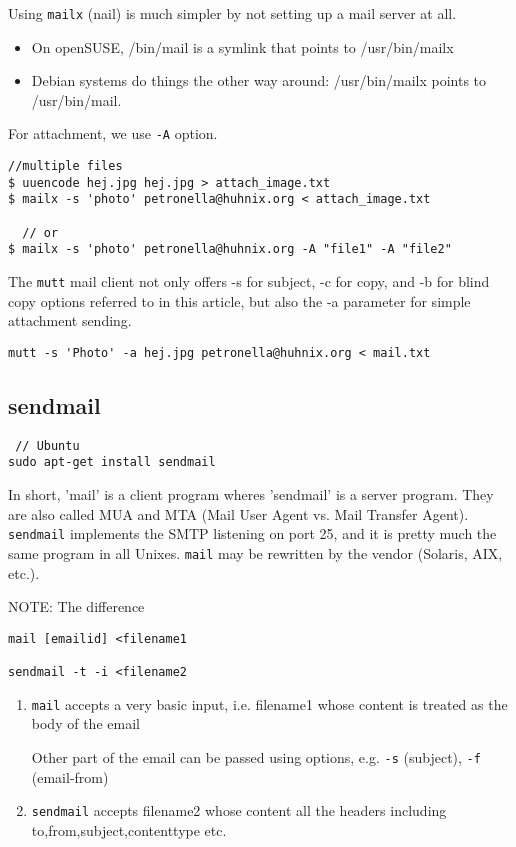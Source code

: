 Using \verb!mailx! (nail) is much simpler by not setting up a mail server at
all.
\begin{itemize}
  \item On openSUSE, /bin/mail is a symlink that points to /usr/bin/mailx
  
  \item Debian systems do things the other way around: /usr/bin/mailx points to
  /usr/bin/mail.
\end{itemize}
For attachment, we use \verb!-A! option.
\begin{verbatim}
//multiple files
$ uuencode hej.jpg hej.jpg > attach_image.txt
$ mailx -s 'photo' petronella@huhnix.org < attach_image.txt

  // or
$ mailx -s 'photo' petronella@huhnix.org -A "file1" -A "file2"
\end{verbatim}

The \verb!mutt! mail client not only offers -s for subject, -c for copy, and -b
for blind copy options referred to in this article, but also the -a parameter
for simple attachment sending. 
\begin{verbatim}
mutt -s 'Photo' -a hej.jpg petronella@huhnix.org < mail.txt
\end{verbatim}

\subsection{sendmail} 

\begin{verbatim}
 // Ubuntu
sudo apt-get install sendmail
\end{verbatim}

In short, 'mail' is a client program wheres 'sendmail' is a server program. They
are also called MUA and MTA (Mail User Agent vs. Mail Transfer Agent). 
\verb!sendmail! implements the SMTP listening on port 25, and it is pretty much
the same program in all Unixes. \verb!mail! may be rewritten by the vendor
(Solaris, AIX, etc.).

NOTE: The difference
\begin{verbatim}
mail [emailid] <filename1 

sendmail -t -i <filename2 
\end{verbatim}
\begin{enumerate}
  \item \verb!mail! accepts a very basic input, i.e. filename1 whose content is
  treated as the body of the email
  
  Other part of the email can be passed using options, e.g. \verb!-s! (subject), 
  \verb!-f! (email-from)
  
  \item \verb!sendmail! accepts filename2 whose content all the headers
  including to,from,subject,contenttype etc.
\end{enumerate}

